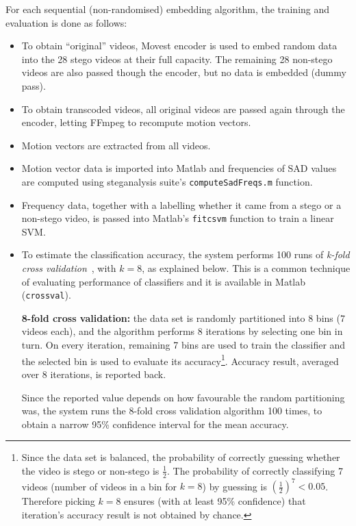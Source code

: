 \documentclass[12pt,british,twoside,notitlepage,usenames,dvipsnames,hypens,final]{report}
\numberwithin{equation}{section}
\numberwithin{figure}{section}
\begin{document}
For each sequential (non-randomised) embedding algorithm, the training and evaluation is done as follows:
\begin{itemize}
\item To obtain ``original'' videos, Movest encoder is used to embed random data into the 28 stego videos at their full capacity. The remaining 28 non-stego videos are also passed though the encoder, but no data is embedded (dummy pass).
\item To obtain transcoded videos, all original videos are passed again through the encoder, letting FFmpeg to recompute motion vectors.
\item Motion vectors are extracted from all videos.
\item Motion vector data is imported into Matlab and frequencies of SAD values are computed using steganalysis suite's \texttt{computeSadFreqs.m} function.
\item Frequency data, together with a labelling whether it came from a stego or a non-stego video, is passed into Matlab's \texttt{fitcsvm} function to train a linear SVM.
\item To estimate the classification accuracy, the system performs 100 runs of \emph{k-fold cross validation}~\cite{ai2-notes}, with $k = 8$, as explained below. This is a common technique of evaluating performance of classifiers and it is available in Matlab (\texttt{crossval}).

\textbf{8-fold cross validation:} the data set is randomly partitioned into 8 bins (7 videos each), and the algorithm performs 8 iterations by selecting one bin in turn. On every iteration, remaining 7 bins are used to train the classifier and the selected bin is used to evaluate its accuracy\footnote{Since the data set is balanced, the probability of correctly guessing whether the video is stego or non-stego is $\frac{1}{2}$. The probability of correctly classifying 7 videos (number of videos in a bin for $k = 8$) by guessing is $(\frac{1}{2})^7 < 0.05$. Therefore picking $k = 8$ ensures (with at least 95\% confidence) that iteration's accuracy result is not obtained by chance.}. Accuracy result, averaged over 8 iterations, is reported back.

Since the reported value depends on how favourable the random partitioning was, the system runs the 8-fold cross validation algorithm 100 times, to obtain a narrow 95\% confidence interval for the mean accuracy.  

\end{itemize}
\end{document}
